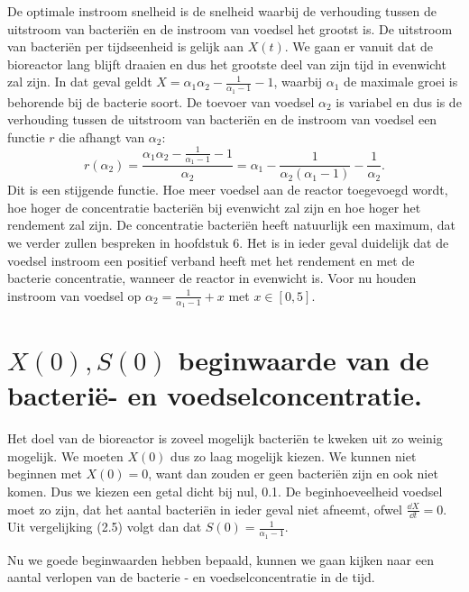 De optimale instroom snelheid is de snelheid waarbij de verhouding tussen de uitstroom van bacteri\"en en de instroom van voedsel het grootst is. De uitstroom van bacteri\"en per tijdseenheid is gelijk aan $X(t)$. We gaan er vanuit dat de bioreactor lang blijft draaien en dus het grootste deel van zijn tijd in evenwicht zal zijn. In dat geval geldt $X = \alpha_1\alpha_2-\frac{1}{\alpha_1-1}-1$, waarbij $\alpha_1$ de maximale groei is behorende bij de bacterie soort. De toevoer van voedsel $\alpha_2$ is variabel en dus is de verhouding tussen de uitstroom van bacteri\"en en de instroom van voedsel een functie $r$ die afhangt van $\alpha_2$:
\[r(\alpha_2) = \frac{\alpha_1\alpha_2-\frac{1}{\alpha_1-1}-1}{\alpha_2} = \alpha_1-\frac{1}{\alpha_2(\alpha_1-1)}-\frac{1}{\alpha_2}.\]
Dit is een stijgende functie. Hoe meer voedsel aan de reactor toegevoegd wordt, hoe hoger de concentratie bacteri\"en bij evenwicht zal zijn en hoe hoger het rendement zal zijn. De concentratie bacteri\"en heeft natuurlijk een maximum, dat we verder zullen bespreken in hoofdstuk 6. Het is in ieder geval duidelijk dat de voedsel instroom een positief verband heeft met het rendement en met de bacterie concentratie, wanneer de reactor in evenwicht is. Voor nu houden instroom van voedsel op $\alpha_2 = \frac{1}{\alpha_1-1} + x$ met $x\in[0, 5]$.

\section{$X(0), S(0)$ beginwaarde van de bacteri\"e- en voedselconcentratie.}
Het doel van de bioreactor is zoveel mogelijk bacteri\"en te kweken uit zo weinig mogelijk. We moeten $X(0)$ dus zo laag mogelijk kiezen. We kunnen niet beginnen met $X(0) = 0$, want dan zouden er geen bacteri\"en zijn en ook niet komen. Dus we kiezen een getal dicht bij nul, 0.1.
De beginhoeveelheid voedsel moet zo zijn, dat het aantal bacteri\"en in ieder geval niet afneemt, ofwel $\frac{\dd X}{\dd t} = 0$. Uit vergelijking (2.5) volgt dan dat $S(0) = \frac{1}{\alpha_1 - 1}$.

Nu we goede beginwaarden hebben bepaald, kunnen we gaan kijken naar een aantal verlopen van de bacterie - en voedselconcentratie in de tijd.
